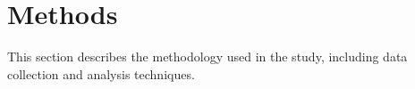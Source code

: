 \section{Methods}
\label{sec:methods}

This section describes the methodology used in the study, including data collection and analysis techniques.
